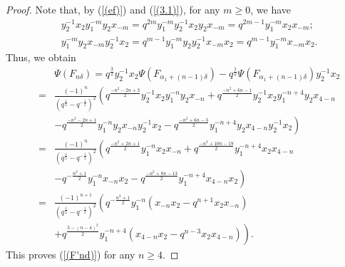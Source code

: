 \documentclass[reqno,11pt]{amsart}
\numberwithin{equation}{section}
\begin{document}
\begin{proof}
Note that, by (\ref{(ef)}) and (\ref{(3.1)}), for any $m \ge 0$, we have
\begin{eqnarray*}
	& y_2^{-1} x_2 y_1^{-m} y_2 x_{-m}=q^{2 m} y_1^{-m} y_2^{-1} x_2 y_2 x_{-m}=q^{2 m-1} y_1^{-m} x_2 x_{-m}; \\
	& y_1^{-m} y_2 x_{-m} y_2^{-1} x_2=q^{m-1} y_1^{-m} y_2 y_2^{-1} x_{-m} x_2=q^{m-1} y_1^{-m} x_{-m} x_2 .
\end{eqnarray*}
Thus, we obtain
\begingroup
{}
\begin{eqnarray*}
	&&\Psi\left(F_{n \delta}\right)=  q^{\frac{3}{2}} y_2^{-1} x_2 \Psi\left(F_{\alpha_1+(n-1) \delta}\right)-q^{\frac{1}{2}} \Psi\left(F_{\alpha_1+(n-1) \delta}\right) y_2^{-1} x_2 \\
	&= & \frac{(-1)^n}{\left(q^{\frac{1}{2}}-q^{-\frac{1}{2}}\right)^2}\left(q^{\frac{-n^2-2 n+3}{2}} y_2^{-1} x_2 y_1^{-n} y_2 x_{-n}\right.  +q^{\frac{-n^2+6 n-1}{2}} y_2^{-1} x_2 y_1^{-n+4} y_2 x_{4-n} \\
	&& \left.-q^{\frac{-n^2-2 n+1}{2}} y_1^{-n} y_2 x_{-n} y_2^{-1} x_2 -q^{\frac{-n^2+6 n-3}{2}} y_1^{-n+4} y_2 x_{4-n} y_2^{-1} x_2\right) \\
	&= & \frac{(-1)^n}{\left(q^{\frac{1}{2}}-q^{-\frac{1}{2}}\right)^2}\left(q^{\frac{-n^2+2 n+1}{2}} y_1^{-n} x_2 x_{-n}+q^{\frac{-n^2+10 n-19}{2}} y_1^{-n+4} x_2 x_{4-n}\right. \\
	&& \left.-q^{-\frac{n^2+1}{2}} y_1^{-n} x_{-n} x_2-q^{\frac{-n^2+8 n-13}{2}} y_1^{-n+4} x_{4-n} x_2\right) \\
	&= & \frac{(-1)^{n+1}}{\left(q^{\frac{1}{2}}-q^{-\frac{1}{2}}\right)^2}\left(q^{-\frac{n^2+1}{2}} y_1^{-n}\left(x_{-n} x_2-q^{n+1} x_2 x_{-n}\right)\right. \\
	&& \left.+q^{\frac{3-(n-4)^2}{2}} y_1^{-n+4}\left(x_{4-n} x_2-q^{n-3} x_2 x_{4-n}\right)\right) .
\end{eqnarray*}
\endgroup
This proves (\ref{(F'nd)}) for any $n \ge 4$.


\end{proof}
\end{document}
